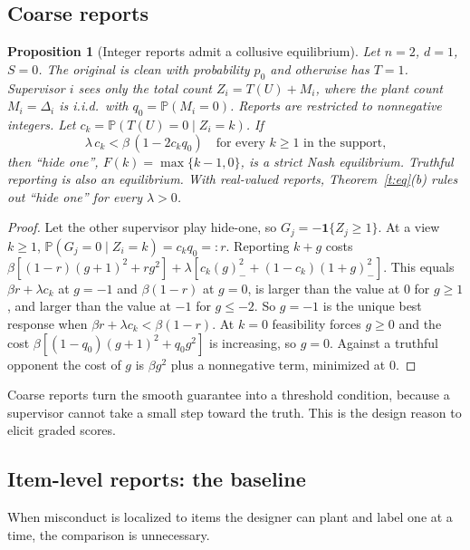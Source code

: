 \documentclass[11pt]{article}
\newtheorem{proposition}{Proposition}
\theoremstyle{definition}
\theoremstyle{remark}
\renewcommand{\P}{\mathbb{P}}
\newcommand{\negp}[1]{(#1)_{-}}
\begin{document}
\subsection{Coarse reports}\label{sec:coarse}

\begin{proposition}[Integer reports admit a collusive equilibrium]\label{p:coarse}
Let $n=2$, $d=1$, $S=0$. The original is clean with probability $p_0$ and otherwise has $T=1$. Supervisor $i$ sees only the total count $Z_i=T(U)+M_i$, where the plant count $M_i=\Delta_i$ is i.i.d.\ with $q_0=\P(M_i=0)$. Reports are restricted to nonnegative integers. Let $c_k=\P(T(U)=0\mid Z_i=k)$. If
\[
\lambda\,c_k<\beta\,(1-2c_kq_0)\quad\text{for every }k\ge1\text{ in the support,}
\]
then ``hide one'', $F(k)=\max\{k-1,0\}$, is a strict Nash equilibrium. Truthful reporting is also an equilibrium. With real-valued reports, Theorem~\ref{t:eq}(b) rules out ``hide one'' for every $\lambda>0$.
\end{proposition}
\begin{proof}
Let the other supervisor play hide-one, so $G_j=-\mathbf 1\{Z_j\ge1\}$. At a view $k\ge1$, $\P(G_j=0\mid Z_i=k)=c_kq_0=:r$. Reporting $k+g$ costs $\beta[(1-r)(g+1)^2+rg^2]+\lambda[c_k\negp g^2+(1-c_k)\negp{1+g}^2]$. This equals $\beta r+\lambda c_k$ at $g=-1$ and $\beta(1-r)$ at $g=0$, is larger than the value at $0$ for $g\ge1$, and larger than the value at $-1$ for $g\le-2$. So $g=-1$ is the unique best response when $\beta r+\lambda c_k<\beta(1-r)$. At $k=0$ feasibility forces $g\ge0$ and the cost $\beta[(1-q_0)(g+1)^2+q_0g^2]$ is increasing, so $g=0$. Against a truthful opponent the cost of $g$ is $\beta g^2$ plus a nonnegative term, minimized at $0$.
\end{proof}

Coarse reports turn the smooth guarantee into a threshold condition, because a supervisor cannot take a small step toward the truth. This is the design reason to elicit graded scores.

\subsection{Item-level reports: the baseline}\label{sec:item}

When misconduct is localized to items the designer can plant and label one at a time, the comparison is unnecessary.
\end{document}
